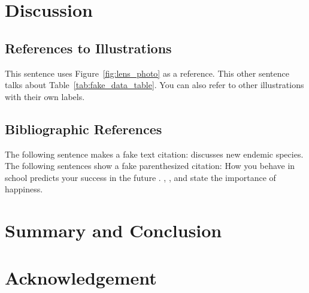 \documentclass{strrespaper-journ}
\newcommand{\fillertext}{\lipsum[1][1-5]}
\begin{document}
	\section{Discussion}
		\subsection{References to Illustrations}
			This sentence uses Figure~\ref{fig:lens_photo} as a reference.
			This other sentence talks about Table~\ref{tab:fake_data_table}.
			You can also refer to other illustrations with their own labels.
		\subsection{Bibliographic References}
			The following sentence makes a fake text citation:
			\textcite{maryaniNewEndemicFusarium2019} discusses new endemic species.
			The following sentences show a fake parenthesized citation:
			How you behave in school predicts your success in the future \autocite{spenglerHowYouBehave2018}.
			\textcite{freyHappinessRevolutionEconomics2008}, \textcite{veenhovenConditionsHappiness2013}, and \textcite{veenhovenHappinessRelative1991} state the importance of happiness.

	\section{Summary and Conclusion}
		\fillertext

	\section{Acknowledgement}
		\fillertext

	\printbibliography
\end{document}
